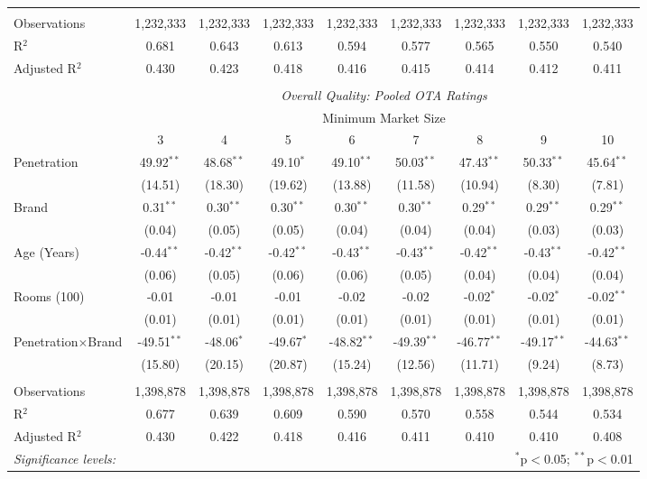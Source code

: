 \begin{table}[!htbp]
{\begin{tabular}{@{\extracolsep{5pt}}lcccccccc}
 \hline
 \\[-1.8ex]
Observations & 1,232,333 & 1,232,333 & 1,232,333 & 1,232,333 & 1,232,333 & 1,232,333 & 1,232,333 & 1,232,333 \\ 
R$^{2}$ & 0.681 & 0.643 & 0.613 & 0.594 & 0.577 & 0.565 & 0.550 & 0.540 \\ 
Adjusted R$^{2}$ & 0.430 & 0.423 & 0.418 & 0.416 & 0.415 & 0.414 & 0.412 & 0.411 \\ 
\hline 
\\[-1.8ex]
& \multicolumn{8}{c}{\textit{Overall Quality: Pooled OTA Ratings}} \\ 
\cline{2-9} 
& \multicolumn{8}{c}{Minimum Market Size} \\ 
 & 3 & 4 & 5 & 6 & 7 & 8 & 9 & 10\\ 
\hline  
 Penetration  & 49.92$^{**}$ & 48.68$^{**}$ & 49.10$^{*}$ & 49.10$^{**}$ & 50.03$^{**}$ & 47.43$^{**}$ & 50.33$^{**}$ & 45.64$^{**}$ \\ 
  & (14.51) & (18.30) & (19.62) & (13.88) & (11.58) & (10.94) & (8.30) & (7.81) \\ 
 Brand & 0.31$^{**}$ & 0.30$^{**}$ & 0.30$^{**}$ & 0.30$^{**}$ & 0.30$^{**}$ & 0.29$^{**}$ & 0.29$^{**}$ & 0.29$^{**}$ \\ 
  & (0.04) & (0.05) & (0.05) & (0.04) & (0.04) & (0.04) & (0.03) & (0.03) \\ 
 Age (Years) & -0.44$^{**}$ & -0.42$^{**}$ & -0.42$^{**}$ & -0.43$^{**}$ & -0.43$^{**}$ & -0.42$^{**}$ & -0.43$^{**}$ & -0.42$^{**}$ \\ 
  & (0.06) & (0.05) & (0.06) & (0.06) & (0.05) & (0.04) & (0.04) & (0.04) \\ 
 Rooms (100) & -0.01 & -0.01 & -0.01 & -0.02 & -0.02 & -0.02$^{*}$ & -0.02$^{*}$ & -0.02$^{**}$ \\ 
  & (0.01) & (0.01) & (0.01) & (0.01) & (0.01) & (0.01) & (0.01) & (0.01) \\ 
 Penetration$\times$Brand & -49.51$^{**}$ & -48.06$^{*}$ & -49.67$^{*}$ & -48.82$^{**}$ & -49.39$^{**}$ & -46.77$^{**}$ & -49.17$^{**}$ & -44.63$^{**}$ \\ 
  & (15.80) & (20.15) & (20.87) & (15.24) & (12.56) & (11.71) & (9.24) & (8.73) \\ 
 \hline
 \\[-1.8ex]
Observations & 1,398,878 & 1,398,878 &  1,398,878 &  1,398,878 &  1,398,878 &  1,398,878 &  1,398,878 &  1,398,878\\ 
R$^{2}$ & 0.677 & 0.639 & 0.609 & 0.590 & 0.570 & 0.558 & 0.544 & 0.534 \\ 
Adjusted R$^{2}$ & 0.430 & 0.422 & 0.418 & 0.416 & 0.411 & 0.410 & 0.410 & 0.408 \\ 
\hline 


\textit{Significance levels:}  & \multicolumn{8}{r}{$^{*}$p$<$0.05; $^{**}$p$<$0.01} \\

\end{tabular} 
} 
\end{table} 
